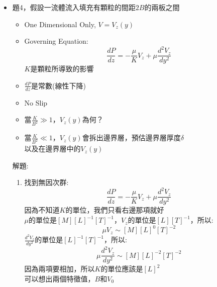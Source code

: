 \documentclass[../main.tex]{subfiles}
\begin{document}
\begin{itemize}
\begin{enumerate}
\begin{align}
      \right) L &= \frac{1}{4} \ln\left(
        \frac{1+4y_2}{1+4y_1}
      \right) \nonumber\\
      \left( \frac{N_A}{C D_{AM}}\right)L &= \frac{1}{4}\ln\left(
        \frac{1+4y_1}{1+4y_2}
      \right)
    \end{align}
    \item 最後解出$N_A$:
    \begin{equation}
      \boxed{N_A = \frac{C D_{AM}}{4L} \ln\left(
        \frac{1+4y_1}{1+4y_2}
      \right)}
    \end{equation}
  \end{enumerate}
  \item 題4，假設一流體流入填充有顆粒的間距$2B$的兩板之間
  \begin{itemize}
    \item One Dimensional Only, $V = V_z(y)$
    \item Governing Equation:
    \begin{equation}
      \frac{dP}{dz} = -\frac{\mu}{K}V_z + \mu\frac{d^2V_z}{dy^2}
    \end{equation}
    $K$是顆粒所導致的影響
    \item $\frac{dP}{dz}$是常數(線性下降)
    \item No Slip
    \item 當$\frac{K}{B^2}\gg1$，$V_z(y)$為何？
    \item 當$\frac{K}{B^2}\ll1$，$V_z(y)$會拆出邊界層，預估邊界層厚度$\delta$\\
    以及在邊界層中的$V_z(y)$
  \end{itemize}
  解題:
  \begin{enumerate}
    \item 找到無因次群:
    \begin{equation}
      \frac{dP}{dz} = -\frac{\mu}{K}V_z + \mu\frac{d^2V_z}{dy^2}
    \end{equation}
    因為不知道$K$的單位，我們只看右邊那項就好\\
    $\mu$的單位是$[M][L]^{-1}[T]^{-1}$，$V_z$的單位是$[L][T]^{-1}$，所以:
    \begin{equation}
      \mu V_z \sim [M][L]^0[T]^{-2}
    \end{equation}
    $\frac{d^2V_z}{dy^2}$的單位是$[L]^{-1}[T]^{-1}$，所以:
    \begin{equation}
      \mu \frac{d^2V_z}{dy^2} \sim [M][L]^{-2}[T]^{-2}
    \end{equation}
    因為兩項要相加，所以$K$的單位應該是$[L]^2$\\
    可以想出兩個特徵值，$B$和$V_0$\\

\end{enumerate}
\end{itemize}
\end{document}
